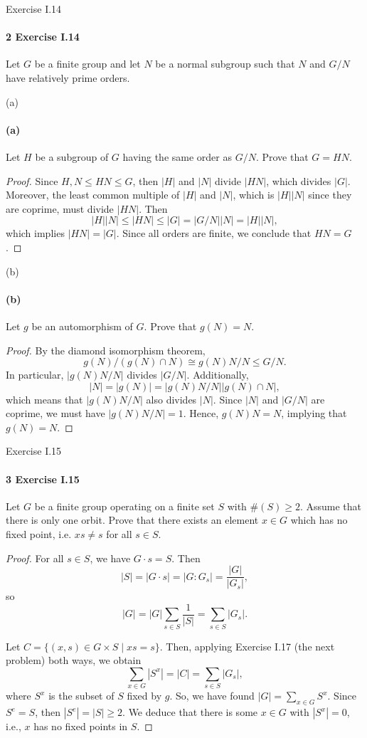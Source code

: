 \documentclass[12pt]{article}
\newlength{\myparskip}
\newenvironment{fullbox}{\begin{lrbox}{\savefullbox}\begin{minipage}{\dimexpr\textwidth-2\fboxsep\relax}\setlength{\parskip}{\myparskip}}{\end{minipage}\end{lrbox}\framebox[\textwidth]{\usebox{\savefullbox}}}
\newenvironment{pbox}[1][]{\begin{fullbox}\ifx#1\empty\else\paragraph{#1}\fi}{\end{fullbox}}
\newcommand{\<}{\langle}
\renewcommand{\>}{\rangle}
\newcommand{\isom}{\cong}
\theoremstyle{definition}
\begin{document}
\newpage
\begin{pbox}[2 Exercise I.14]
    Let $G$ be a finite group and let $N$ be a normal subgroup such that $N$ and $G/N$ have relatively prime orders.
\end{pbox}

\begin{pbox}[(a)]
    Let $H$ be a subgroup of $G$ having the same order as $G/N$. Prove that $G = HN$.
\end{pbox}

\begin{proof}
    Since $H, N \leq HN \leq G$, then $|H|$ and $|N|$ divide $|HN|$, which divides $|G|$. Moreover, the least common multiple of $|H|$ and $|N|$, which is $|H||N|$ since they are coprime, must divide $|HN|$. Then
    \[
        |H||N|
            \leq |HN|
            \leq |G|
            = |G/N||N|
            = |H||N|,
    \]
    which implies $|HN| = |G|$. Since all orders are finite, we conclude that $HN = G$.

\end{proof}

\begin{pbox}[(b)]
    Let $g$ be an automorphism of $G$. Prove that $g(N) = N$.
\end{pbox}

\begin{proof}
    By the diamond isomorphism theorem,
    \[
        g(N)/(g(N) \cap N) \isom g(N)N/N \leq G/N.
    \]
    In particular, $|g(N)N/N|$ divides $|G/N|$. Additionally,
    \[
        |N| = |g(N)| = |g(N)N/N||g(N) \cap N|,
    \]
    which means that $|g(N)N/N|$ also divides $|N|$. Since $|N|$ and $|G/N|$ are coprime, we must have $|g(N)N/N| = 1$. Hence, $g(N)N = N$, implying that $g(N) = N$.

\end{proof}


\newpage
\begin{pbox}[3 Exercise I.15]
    Let $G$ be a finite group operating on a finite set $S$ with $\#(S) \geq 2$. Assume that there is only one orbit. Prove that there exists an element $x \in G$ which has no fixed point, i.e. $xs \ne s$ for all $s \in S$.
\end{pbox}

\begin{proof}
    For all $s \in S$, we have $G \cdot s = S$. Then
    \[
        |S| = |G \cdot s| = |G : G_s| = \frac{|G|}{|G_s|},
    \]
    so
    \[
        |G|
            = |G|\sum_{s \in S} \frac{1}{|S|}
            = \sum_{s \in S} |G_s|.
    \]

    Let $C = \{(x, s) \in G \times S \mid xs = s\}$. Then, applying Exercise I.17 (the next problem) both ways, we obtain
    \[
        \sum_{x \in G} |S^x| = |C| = \sum_{s \in S} |G_s|,
    \]
    where $S^x$ is the subset of $S$ fixed by $g$. So, we have found $|G| = \sum_{x \in G} S^x$. Since $S^e = S$, then $|S^e| = |S| \geq 2$. We deduce that there is some $x \in G$ with $|S^x| = 0$, i.e., $x$ has no fixed points in $S$.

\end{proof}
\end{document}

